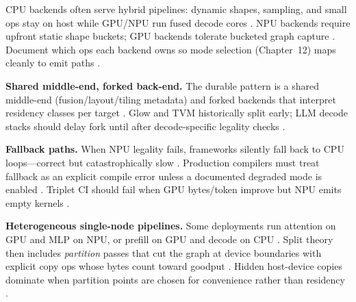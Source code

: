 CPU backends often serve hybrid pipelines: dynamic shapes, sampling, and small ops stay on host while GPU/NPU run fused decode cores \citep{kwon2023vllm,patel2025llminference,yirage2026,chen2020compilerbasedhardw,taxbreak2026,memoryfloor2026,amd2024xdna,amd2024aie,dlbook,liu2024deepseekv3,dao2022flashattention,semianalysis2024tma,dao2023flashdecoding,nvidia2022hopper,nvidia2024cudagraphs}. NPU backends require upfront static shape buckets; GPU backends tolerate bucketed graph capture \citep{nvidia2024cudagraphs,amd2024aie,yirage2026,chen2020compilerbasedhardw,patel2025llminference,taxbreak2026,memoryfloor2026,amd2024xdna,semianalysis2024tma,dlbook,kwon2023vllm,liu2024deepseekv3,dao2022flashattention,dao2023flashdecoding,nvidia2022hopper}. Document which ops each backend owns so mode selection (Chapter~12) maps cleanly to emit paths \citep{yirage2026,chen2020compilerbasedhardw,patel2025llminference,taxbreak2026,memoryfloor2026,nvidia2024cudagraphs,amd2024xdna,amd2024aie,semianalysis2024tma,dlbook,kwon2023vllm,liu2024deepseekv3,dao2022flashattention,dao2023flashdecoding,nvidia2022hopper}.

\textbf{Shared middle-end, forked back-end.} The durable pattern is a shared middle-end (fusion/layout/tiling metadata) and forked backends that interpret residency classes per target \citep{yirage2026,chen2020compilerbasedhardw,amd2024xdna,amd2024aie,dlbook}. Glow and TVM historically split early; LLM decode stacks should delay fork until after decode-specific legality checks \citep{chen2020compilerbasedhardw,patel2025llminference,yirage2026,taxbreak2026}.

\textbf{Fallback paths.} When NPU legality fails, frameworks silently fall back to CPU loops---correct but catastrophically slow \citep{amd2024xdna,amd2024aie,yirage2026,patel2025llminference}. Production compilers must treat fallback as an explicit compile error unless a documented degraded mode is enabled \citep{chen2020compilerbasedhardw,yirage2026,memoryfloor2026,taxbreak2026}. Triplet CI should fail when GPU bytes/token improve but NPU emits empty kernels \citep{patel2025llminference,amd2024aie,amd2024xdna}.

\textbf{Heterogeneous single-node pipelines.} Some deployments run attention on GPU and MLP on NPU, or prefill on GPU and decode on CPU \citep{patel2025llminference,liu2024deepseekv3,kwon2023vllm}. Split theory then includes \emph{partition} passes that cut the graph at device boundaries with explicit copy ops whose bytes count toward goodput \citep{yirage2026,chen2020compilerbasedhardw,taxbreak2026,memoryfloor2026,dlbook}. Hidden host-device copies dominate when partition points are chosen for convenience rather than residency \citep{patel2025llminference,taxbreak2026}.

